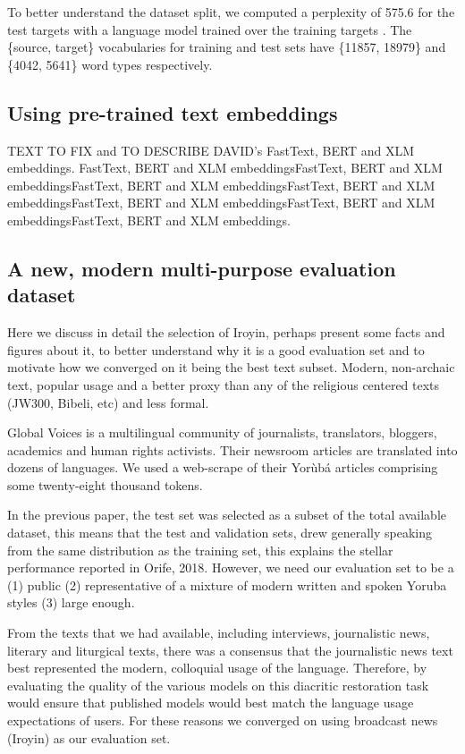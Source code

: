 \documentclass{article} %
\begin{document}
To better understand the dataset split, we computed a perplexity of 575.6 for the test targets with a language model trained over the training targets \citep{stolcke2002srilm}. The \{source, target\} vocabularies for training and test sets have \{11857, 18979\} and \{4042, 5641\} word types respectively.

\subsection{Using pre-trained text embeddings}
TEXT TO FIX and TO DESCRIBE DAVID's FastText, BERT and XLM embeddings. FastText, BERT and XLM embeddingsFastText, BERT and XLM embeddingsFastText, BERT and XLM embeddingsFastText, BERT and XLM embeddingsFastText, BERT and XLM embeddingsFastText, BERT and XLM embeddingsFastText, BERT and XLM embeddings.


\subsection{A new, modern multi-purpose evaluation dataset}\label{sec:evaldataset}
Here we discuss in detail the selection of Iroyin, perhaps present some facts and figures about it, to better understand why it is a good evaluation set and to motivate how we converged on it being the best text subset. Modern, non-archaic text, popular usage and a better proxy than any of the religious centered texts (JW300, Bibeli, etc) and less formal.

Global Voices is a multilingual community of journalists, translators, bloggers, academics and human rights activists. Their newsroom articles are translated into dozens of languages. We used a web-scrape of their Yor{\`u}b{\'a} articles comprising some twenty-eight thousand tokens.

In the previous paper, the test set was selected as a subset of the total available dataset, this means that the test and validation sets, drew generally speaking from the same distribution as the training set, this explains the stellar performance reported in Orife, 2018. However, we need our evaluation set to be a (1) public (2) representative of a mixture of modern written and spoken Yoruba styles (3) large enough. 

From the texts that we had available, including interviews, journalistic news, literary and liturgical texts, there was a consensus that the journalistic news text best represented the modern, colloquial usage of the language. Therefore, by evaluating the quality of the various models on this diacritic restoration task would ensure that published models would best match the language usage expectations of users. For these reasons we converged on using broadcast news (Iroyin) as our evaluation set.
\end{document}
